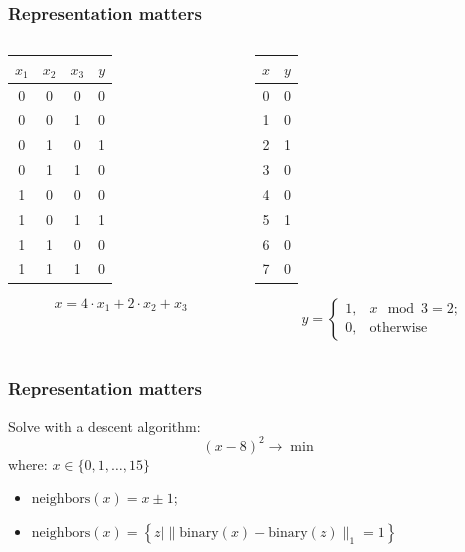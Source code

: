 \documentclass[mathserif, aspectratio=43]{beamer}
\begin{document}
\begin{frame}[fragile]
\frametitle{Representation matters}
\begin{columns}
\begin{column}{0.4875\textwidth}
\begin{center}
\begin{tabular}{ c c c | c }
$x_1$ & $x_2$ & $x_3$ & $y$ \\
\hline
0 & 0 & 0 & 0\\
\hline
0 & 0 & 1 & 0\\
\hline
0 & 1 & 0 & 1\\
\hline
0 & 1 & 1 & 0\\
\hline
1 & 0 & 0 & 0\\
\hline
1 & 0 & 1 & 1\\
\hline
1 & 1 & 0 & 0\\
\hline
1 & 1 & 1 & 0
\end{tabular}
\end{center}
$$x = 4\cdot x_1 + 2\cdot x_2 + x_3 $$


\end{column}
\begin{column}{0.4875\textwidth}
\begin{center}
\begin{tabular}{ c | c }
$x$ & $y$ \\
\hline
0 & 0\\
\hline
1 & 0\\
\hline
2 & 1\\
\hline
3 & 0\\
\hline
4 & 0\\
\hline
5 & 1\\
\hline
6 & 0\\
\hline
7 & 0
\end{tabular}
\end{center}
$$y = \begin{cases} 1,& x \mod 3 = 2;\\ 0, &\text{otherwise} \end{cases}$$


\end{column}
\end{columns}

\end{frame}


\begin{frame}[fragile]
\frametitle{Representation matters}
Solve with a descent algorithm:
$$(x - 8) ^2 \to \min$$where: $x \in \{0, 1, \dots, 15\}$
\begin{itemize}
\item $\mathrm{neighbors}(x) = x \pm 1$;
\item $\mathrm{neighbors}(x) = \left\{ z \mid  \|\mathrm{binary}(x) - \mathrm{binary}(z)\|_1 = 1 \right\}$
\end{itemize}

\end{frame}
\end{document}
